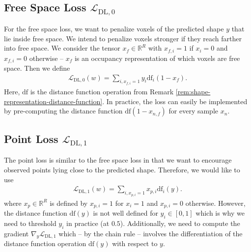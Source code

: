\subsection{Free Space Loss $\mathcal{L}_{\text{DL},0}$}

For the free space loss, we want to penalize voxels of the predicted shape
$y$ that lie inside free space. We intend to penalize voxels stronger if they
reach farther into free space. We consider the tensor $x_f \in \mathbb{R}^R$
with $x_{f,i} = 1$ if $x_i = 0$ and $x_{f,i} = 0$ otherwise
-- \ie $x_f$ is an occupancy representation of which voxels are free space.
Then we define
\begin{align}
  \mathcal{L}_{\text{DL},0}(w) = \sum_{i, x_{f,i} = 1} y_i \text{df}_i(1 - x_f).
  \label{eq:shape-inference-free-space-loss}
\end{align}
Here, $\text{df}$ is the distance function operation from Remark
\ref{rem:shape-representation-distance-function}. In practice, 
the loss can easily be implemented
by pre-computing the distance function $\text{df}(1 - x_{n,f})$ for every
sample $x_n$.

\subsection{Point Loss $\mathcal{L}_{\text{DL},1}$}

The point loss is similar to the free space loss in that we want to encourage
observed points lying close to the predicted shape. Therefore, we would like to
use
\begin{align}
  \mathcal{L}_{\text{DL},1}(w) = \sum_{i, x_{p,i} = 1} x_{p,i} \text{df}_i(y).
  \label{eq:shape-inference-dl-1}
\end{align}
where $x_p \in \mathbb{R}^R$ is defined by $x_{p,i} = 1$ for $x_i = 1$ and
$x_{p,i} = 0$ otherwise. However, the distance function $\text{df}(y)$ is
not well defined for $y_i \in [0,1]$ which is why we need to threshold $y_i$
in practice (\eg at $0.5$). Additionally, we need to compute the gradient
$\nabla_y \mathcal{L}_{\text{DL},1}$ which -- by the chain rule -- involves
the differentiation of the distance function operation $\text{df}(y)$
with respect to $y$.

